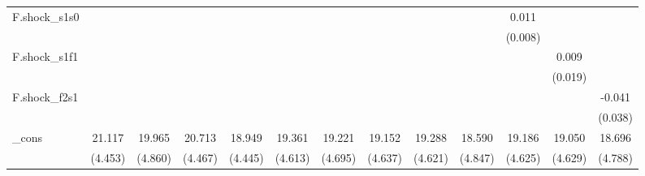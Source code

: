 {\begin{tabular}{l*{12}{c}}
\addlinespace
F.shock\_s1s0&                     &                     &                     &                     &                     &                     &                     &                     &                     &       0.011         &                     &                     \\
            &                     &                     &                     &                     &                     &                     &                     &                     &                     &     (0.008)         &                     &                     \\
\addlinespace
F.shock\_s1f1&                     &                     &                     &                     &                     &                     &                     &                     &                     &                     &       0.009         &                     \\
            &                     &                     &                     &                     &                     &                     &                     &                     &                     &                     &     (0.019)         &                     \\
\addlinespace
F.shock\_f2s1&                     &                     &                     &                     &                     &                     &                     &                     &                     &                     &                     &      -0.041         \\
            &                     &                     &                     &                     &                     &                     &                     &                     &                     &                     &                     &     (0.038)         \\
\addlinespace
\_cons      &      21.117\sym{***}&      19.965\sym{***}&      20.713\sym{***}&      18.949\sym{***}&      19.361\sym{***}&      19.221\sym{***}&      19.152\sym{***}&      19.288\sym{***}&      18.590\sym{***}&      19.186\sym{***}&      19.050\sym{***}&      18.696\sym{***}\\
            &     (4.453)         &     (4.860)         &     (4.467)         &     (4.445)         &     (4.613)         &     (4.695)         &     (4.637)         &     (4.621)         &     (4.847)         &     (4.625)         &     (4.629)         &     (4.788)         \\

\end{tabular}}
